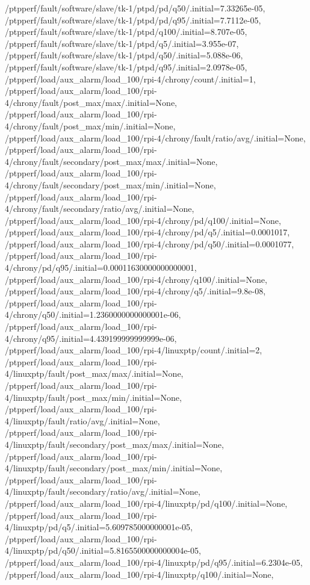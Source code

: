 {    /ptpperf/fault/software/slave/tk-1/ptpd/pd/q50/.initial=7.33265e-05,
    /ptpperf/fault/software/slave/tk-1/ptpd/pd/q95/.initial=7.7112e-05,
    /ptpperf/fault/software/slave/tk-1/ptpd/q100/.initial=8.707e-05,
    /ptpperf/fault/software/slave/tk-1/ptpd/q5/.initial=3.955e-07,
    /ptpperf/fault/software/slave/tk-1/ptpd/q50/.initial=5.088e-06,
    /ptpperf/fault/software/slave/tk-1/ptpd/q95/.initial=2.0978e-05,
    /ptpperf/load/aux_alarm/load_100/rpi-4/chrony/count/.initial=1,
    /ptpperf/load/aux_alarm/load_100/rpi-4/chrony/fault/post_max/max/.initial=None,
    /ptpperf/load/aux_alarm/load_100/rpi-4/chrony/fault/post_max/min/.initial=None,
    /ptpperf/load/aux_alarm/load_100/rpi-4/chrony/fault/ratio/avg/.initial=None,
    /ptpperf/load/aux_alarm/load_100/rpi-4/chrony/fault/secondary/post_max/max/.initial=None,
    /ptpperf/load/aux_alarm/load_100/rpi-4/chrony/fault/secondary/post_max/min/.initial=None,
    /ptpperf/load/aux_alarm/load_100/rpi-4/chrony/fault/secondary/ratio/avg/.initial=None,
    /ptpperf/load/aux_alarm/load_100/rpi-4/chrony/pd/q100/.initial=None,
    /ptpperf/load/aux_alarm/load_100/rpi-4/chrony/pd/q5/.initial=0.0001017,
    /ptpperf/load/aux_alarm/load_100/rpi-4/chrony/pd/q50/.initial=0.0001077,
    /ptpperf/load/aux_alarm/load_100/rpi-4/chrony/pd/q95/.initial=0.00011630000000000001,
    /ptpperf/load/aux_alarm/load_100/rpi-4/chrony/q100/.initial=None,
    /ptpperf/load/aux_alarm/load_100/rpi-4/chrony/q5/.initial=9.8e-08,
    /ptpperf/load/aux_alarm/load_100/rpi-4/chrony/q50/.initial=1.2360000000000001e-06,
    /ptpperf/load/aux_alarm/load_100/rpi-4/chrony/q95/.initial=4.439199999999999e-06,
    /ptpperf/load/aux_alarm/load_100/rpi-4/linuxptp/count/.initial=2,
    /ptpperf/load/aux_alarm/load_100/rpi-4/linuxptp/fault/post_max/max/.initial=None,
    /ptpperf/load/aux_alarm/load_100/rpi-4/linuxptp/fault/post_max/min/.initial=None,
    /ptpperf/load/aux_alarm/load_100/rpi-4/linuxptp/fault/ratio/avg/.initial=None,
    /ptpperf/load/aux_alarm/load_100/rpi-4/linuxptp/fault/secondary/post_max/max/.initial=None,
    /ptpperf/load/aux_alarm/load_100/rpi-4/linuxptp/fault/secondary/post_max/min/.initial=None,
    /ptpperf/load/aux_alarm/load_100/rpi-4/linuxptp/fault/secondary/ratio/avg/.initial=None,
    /ptpperf/load/aux_alarm/load_100/rpi-4/linuxptp/pd/q100/.initial=None,
    /ptpperf/load/aux_alarm/load_100/rpi-4/linuxptp/pd/q5/.initial=5.609785000000001e-05,
    /ptpperf/load/aux_alarm/load_100/rpi-4/linuxptp/pd/q50/.initial=5.8165500000000004e-05,
    /ptpperf/load/aux_alarm/load_100/rpi-4/linuxptp/pd/q95/.initial=6.2304e-05,
    /ptpperf/load/aux_alarm/load_100/rpi-4/linuxptp/q100/.initial=None,
}
